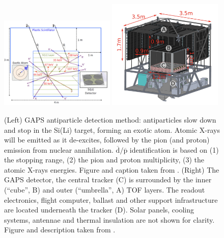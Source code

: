 \begin{figure}[hbtp]
    \centering
    \includegraphics[width=0.49\textwidth]{figures/GAPS_detection_technique.png}
    \includegraphics[width=0.49\textwidth]{figures/GAPS_setup.png}
    \caption{(Left) GAPS antiparticle detection method: antiparticles slow down and stop in the Si(Li) target, forming an exotic atom. Atomic X-rays will be emitted as it de-excites, followed by the pion (and proton) emission from nuclear annihilation. $\overline{\mathrm{d}}/\overline{\mathrm{p}}$ identification is based on (1) the stopping range, (2) the pion and proton multiplicity, (3) the atomic X-rays energies. Figure and caption taken from \cite{GAPS_method_Vanuccini}. (Right) The GAPS detector, the central tracker (C) is surrounded by the inner (“cube”, B) and outer (“umbrella”, A) TOF layers. The readout electronics, flight computer, ballast and other support infrastructure are located underneath the tracker (D). Solar panels, cooling systems, antennae and thermal insulation are not shown for clarity. Figure and description taken from \cite{GAPS_setup_Bird}.}
    \label{fig:GAPS_measurement_technique}
\end{figure}

